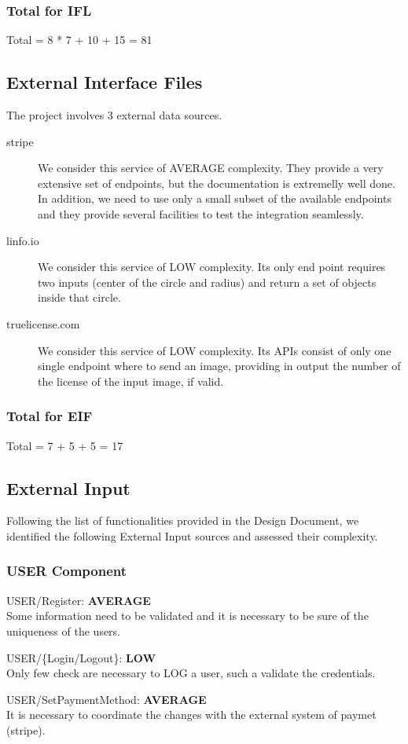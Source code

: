 \documentclass[11pt]{article} %
\newcommand{\extInput}[3]{ #1:  \textbf{#2} \\ #3  }
\begin{document}
\subsubsection{Total for IFL}
Total = 8 * 7 + 10 + 15 =  81


\subsection{External Interface Files}

The project involves 3 external data sources.

\begin{description}
	\item[stripe] We consider this service of AVERAGE complexity. They provide a very extensive set of endpoints, but the documentation is extremelly well done. In addition, we need to use only a small subset of the available endpoints and they provide several facilities to test the integration seamlessly.
	\item[linfo.io] We consider this service of LOW complexity. Its only end point requires two inputs (center of the circle and radius) and return a set of objects inside that circle.
	\item[truelicense.com] We consider this service of LOW complexity. Its APIs consist of only one single endpoint where to send an image, providing in output the number of the license of the input image, if valid.
\end{description}

\subsubsection{Total for EIF}
Total = 7 + 5 + 5 = 17

\subsection{External Input}

Following the list of functionalities provided in the Design Document, we identified the following External Input sources and assessed their complexity.

\subsubsection{USER Component}


\begin{description}
	\item \extInput
		{USER/Register}
		{AVERAGE}
		{Some information need to be validated and it is necessary to be sure of the uniqueness of the users.}
	\item \extInput
		{USER/\{Login/Logout\}}
		{LOW}
		{Only few check are necessary to LOG a user, such a validate the credentials.}
	\item \extInput
		{USER/SetPaymentMethod}
		{AVERAGE}
		{It is necessary to coordinate the changes with the external system of paymet (stripe).}

\end{description}
\end{document}
